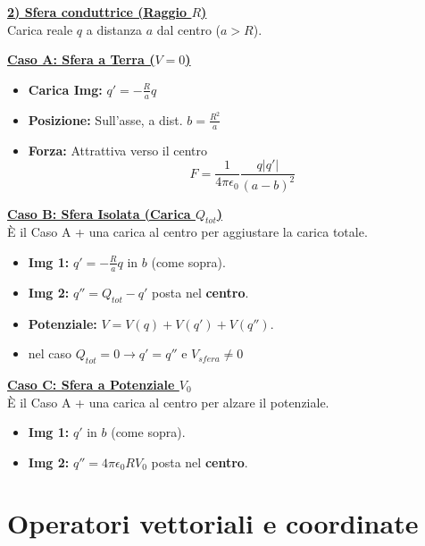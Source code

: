 \documentclass{book}
\begin{document}
\begin{minipage}[t]{0.48\textwidth}
\underline{\textbf{2) Sfera conduttrice (Raggio $R$)}} \\
Carica reale $q$ a distanza $a$ dal centro ($a>R$).

\vspace{0.1cm}
\underline{\textbf{Caso A: Sfera a Terra ($V=0$)}}
\begin{itemize}[leftmargin=*, noitemsep]
    \item \textbf{Carica Img:} $q' = -\frac{R}{a}q$
    \item \textbf{Posizione:} Sull'asse, a dist. $b = \frac{R^2}{a}$
    \item \textbf{Forza:} Attrattiva verso il centro
    $$ F = \frac{1}{4\pi\epsilon_0} \frac{q |q'|}{(a-b)^2} $$
\end{itemize}

\underline{\textbf{Caso B: Sfera Isolata (Carica $Q_{tot}$)}} \\
È il Caso A + una carica al centro per aggiustare la carica totale.
\begin{itemize}[leftmargin=*, noitemsep]
    \item \textbf{Img 1:} $q' = -\frac{R}{a}q$ in $b$ (come sopra).
    \item \textbf{Img 2:} $q'' = Q_{tot} - q'$ posta nel \textbf{centro}.
    \item \textbf{Potenziale:} $V = V(q) + V(q') + V(q'')$.
    \item nel caso $Q_{tot}=0 \to q'=q''$ e $V_{sfera}\neq 0$
\end{itemize}

\underline{\textbf{Caso C: Sfera a Potenziale $V_0$}} \\
È il Caso A + una carica al centro per alzare il potenziale.
\begin{itemize}[leftmargin=*, noitemsep]
    \item \textbf{Img 1:} $q'$ in $b$ (come sopra).
    \item \textbf{Img 2:} $q'' = 4\pi\epsilon_0 R V_0$ posta nel \textbf{centro}.
\end{itemize}
\end{minipage}
\hrulefill



\section*{Operatori vettoriali e coordinate}
\end{document}
